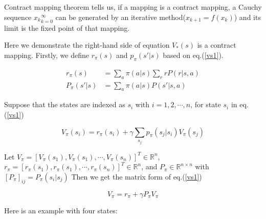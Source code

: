 Contract mapping theorem tells us, if a mapping is a contract mapping, a Cauchy sequence ${x_k}_{k=0}^{\infty}$ can be generated by an
iterative method($x_{k+1}=f(x_k)$) and its limit is the fixed point of that mapping. \par

Here we demonstrate the right-hand side of equation $V_{*}^{}(s)$ is a contract mapping. Firstly, we define $r_{\pi}(s)$ and $p_{\pi}(s'|s)$
based on eq.(\ref{vs1}).

\begin{align*}
	r_{\pi}(s)    & = \sum_{a}\pi(a|s)\sum_{r}rP(r|s,a) \\
	P_{\pi}(s'|s) & = \sum_{a}\pi(a|s)P(s'|s,a)
\end{align*}

Suppose that the states are indexed as $s_{i}$ with $i=1,2,\cdots,n$, for state $s_{i}$ in eq.(\ref{vs1})

\begin{equation*}
	V_{\pi}(s_i)=r_{\pi}(s_i)+\gamma \sum_{s_j}p_{\pi}(s_j|s_i)V_{\pi}(s_j)
\end{equation*}

{\linespread{1.13}\selectfont
Let $V_{\pi}=[V_{\pi}(s_1),V_{\pi}(s_1),\cdots,V_{\pi}(s_n)]^T \in \mathbb{R}^n$,  $r_{\pi}=[r_{\pi}(s_1),r_{\pi}(s_1),\cdots,r_{\pi}(s_n)]^T \in \mathbb{R}^n$, and $P_{\pi} \in \mathbb{R}^{n \times n}$ with $[P_{\pi}]_{ij}=P_{\pi}(s_i|s_j)$ Then we get the matrix form of eq.(\ref{vs1}) \par}

\begin{equation*}
	V_{\pi}=r_{\pi}+\gamma P_{\pi}V_{\pi}
\end{equation*}

Here is an example with four states:

